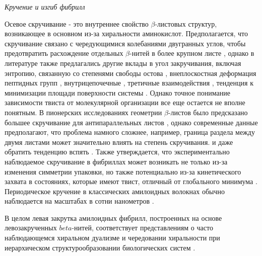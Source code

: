     \emph{Кручение и изгиб фибрилл}
    
    Осевое скручивание - это внутреннее свойство $\beta$-листовых структур, возникающее в основном из-за хиральности аминокислот. Предполагается, что скручивание связано с чередующимися колебаниями двугранных углов, чтобы предотвратить расхождение отдельных $\beta$-нитей в более крупном листе \cite{he_mathematics_2011}, однако в литературе также предлагались другие вклады в угол закручивания, включая энтропию, связанную со степенями свободы остова \cite{chothia_conformation_1973}, внеплоскостная деформация пептидных групп \cite{salemme_structural_1983}, внутрицепочечные \cite{chou_role_1983}, третичные взаимодействия \cite{yang_free_1995,wang_molecular_1996}, тенденция к минимизации площади поверхности системы \cite{koh_minimal_2005}. Однако точное понимание зависимости твиста от молекулярной организации все еще остается не вполне понятным. В пионерских исследованиях геометрии $\beta$-листов было предсказано большее скручивание для антипараллельных листов \cite{chou_origin_1982}, однако современные данные предполагают, что проблема намного сложнее, например, граница раздела между двумя листами может значительно влиять на степень скручивания. и даже обратить тенденцию вспять \cite{berryman_prediction_2008}. Также утверждается, что экспериментально наблюдаемое скручивание в фибриллах может возникать не только из-за изменения симметрии упаковки, но также потенциально из-за кинетического захвата в состояниях, которые имеют твист, отличный от глобального минимума \cite{berryman_prediction_2008}. Периодическое кручение в классических амилоидных волокнах обычно наблюдается на масштабах в сотни нанометров \cite{paparcone_microscale_2009}.
    
       В целом левая закрутка амилоидных фибрилл, построенных на основе левозакрученных $beta$-нитей, соответствует представлениям о часто наблюдающемся хиральном дуализме и чередовании хиральности при иерархическом структурообразовании биологических систем \cite{tverdislov_chiral_2016}.
    
